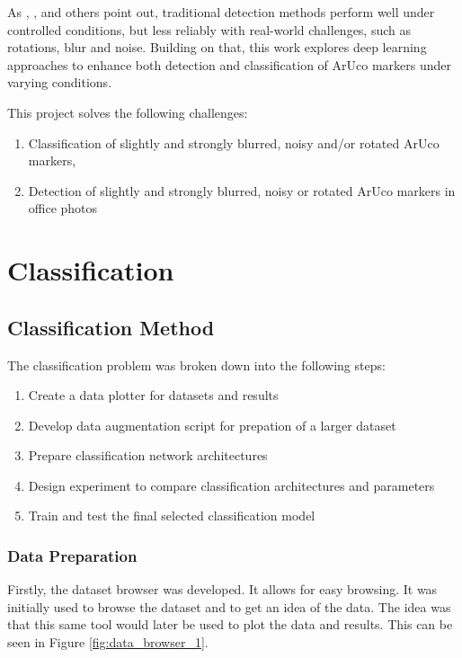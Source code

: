 \documentclass[conference]{IEEEtran}
\begin{document}
As \textcite{FiducialMarkerNoisy}, \textcite{ROMERORAMIREZ2021104094}, and others point out, traditional detection methods perform well under controlled 
conditions, but less reliably with real-world challenges, such as rotations, blur and noise. Building on that, this work explores deep learning 
approaches to enhance both detection and classification of ArUco markers under varying conditions. 

This project solves the following challenges:

\begin{enumerate}
  \item Classification of slightly and strongly blurred, noisy and/or rotated ArUco markers,
  \item Detection of slightly and strongly blurred, noisy or rotated ArUco markers in office photos
\end{enumerate}

\section{Classification}

\subsection{Classification Method}

The classification problem was broken down into the following steps:

\begin{enumerate}
  \item Create a data plotter for datasets and results
  \item Develop data augmentation script for prepation of a larger dataset  
  \item Prepare classification network architectures
  \item Design experiment to compare classification architectures and parameters
  \item Train and test the final selected classification model
\end{enumerate}

\subsubsection{Data Preparation}

Firstly, the dataset browser was developed. It allows for easy browsing. It was initially used to browse the dataset and to get an idea of the data. 
The idea was that this same tool would later be used to plot the data and results. This can be seen in Figure \ref{fig:data_browser_1}.
\end{document}
